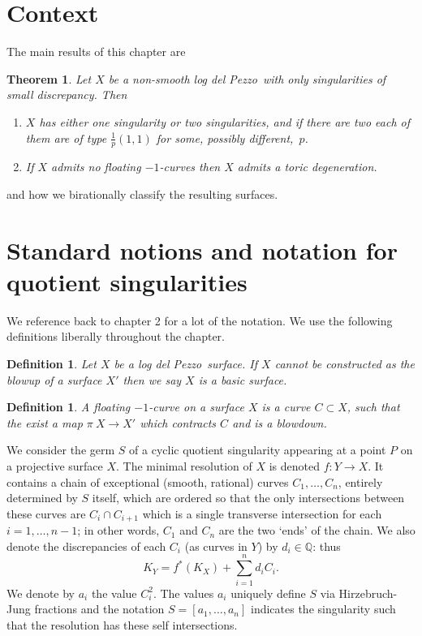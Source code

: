 \documentclass[12pt]{amsbook}
\theoremstyle{plain}
\newtheorem*{thm*}{Theorem}
\newtheorem{dfn}[thm]{Definition}
\newcommand{\ldp}{log del Pezzo}
\newcommand{\Q}{\mathbb{Q}}
\begin{document}
 

\setcounter{chapter}{3}

\section{Context}
The main results of this chapter are 
\begin{thm*}\label{ThmOnSing}
Let $X$ be a non-smooth \ldp\ with only singularities of small discrepancy. Then 
\begin{enumerate}
\item\label{thm38i}
$X$ has either one singularity or two singularities, and if there are two each of them are of type $\frac{1}p(1,1)$ for some, possibly different,~$p$.
\item\label{thm38ii}
If $X$ admits no floating $-1$-curves then $X$ admits a toric degeneration. %
\end{enumerate}
\end{thm*}
and how we birationally classify the resulting surfaces.

\section{Standard notions and notation for quotient singularities}
We reference back to chapter 2 for a lot of the notation. We use the following definitions liberally throughout the chapter.
\begin{dfn}
Let $X$ be a \ldp\ surface. If $X$ cannot be constructed as the blowup of a surface $X'$ then we say $X$ is a basic surface.

\end{dfn}

\begin{dfn}
A floating $-1$-curve on a surface $X$ is a curve $C \subset X$, such that the exist a map $\pi\: X \rightarrow X'$ which contracts $C$ and is a blowdown.
\end{dfn}

We consider the germ $S$ of a cyclic quotient singularity appearing at a point $P$ on a 
projective surface $X$.
The minimal resolution of $X$ is denoted $f\colon Y \longrightarrow X$. It contains a chain of
exceptional (smooth, rational)
curves $C_1,\dots,C_n$, entirely determined by $S$ itself, which are ordered so
that the only intersections between these curves are
$C_i\cap C_{i+1}$ which is a single transverse intersection for each $i=1,\dots,n-1$; 
in other words,
$C_1$ and $C_n$ are the two `ends' of the chain.
We also denote the discrepancies of each $C_i$ (as curves in $Y$) by $d_i\in\Q$: thus
\[
K_Y = f^*(K_X) + \sum_{i=1}^n d_i C_i.
\]
We denote by $a_i$ the value $C_i^2$. The values $a_i$ uniquely define $S$ via Hirzebruch-Jung fractions \cite{ReidCyclic} and the notation $S=[a_1, \dots , a_n]$ indicates the singularity such that the resolution has these self intersections.
\label{sec!notation}
\end{document}

